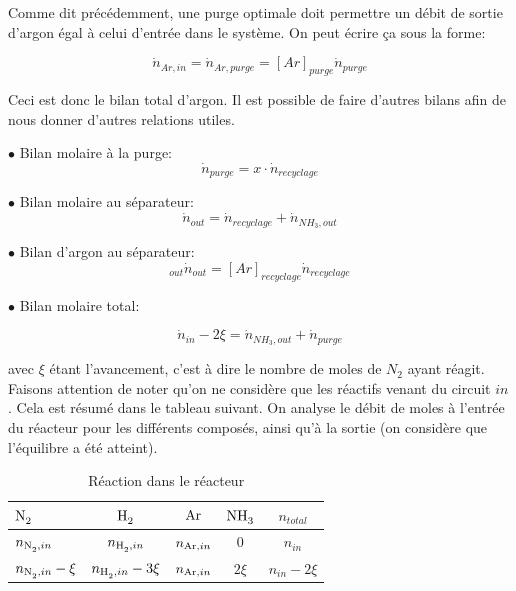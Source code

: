 \documentclass[a4paper, oneside, 12pt]{article}
\begin{document}
Comme dit précédemment, une purge optimale doit permettre un débit 
de sortie d'argon égal à celui d'entrée dans le système. 
On peut écrire ça sous la forme:

\begin{equation}
\dot{n}_{Ar,in}=\dot{n}_{Ar,purge}=[Ar]_{purge} \dot{n}_{purge}
\end{equation}

Ceci est donc le bilan total d'argon. 
Il est possible de faire d'autres bilans afin de nous donner d'autres relations utiles.

$\bullet$ Bilan molaire à la purge:
\begin{equation}
\dot{n}_{purge} = x \cdot \dot{n}_{recyclage}
\label{eq:bilan_mol_purge}
\end{equation}

$\bullet$ Bilan molaire au séparateur:
\begin{equation}
\dot{n}_{out}=\dot{n}_{recyclage}+\dot{n}_{NH_3,out}
\end{equation}

$\bullet$ Bilan d'argon au séparateur:
\begin{equation}
[Ar]_{out} \dot{n}_{out}=[Ar]_{recyclage} \dot{n}_{recyclage}
\end{equation}

$\bullet$ Bilan molaire total:

\begin{equation}
	\dot{n}_{in} - 2\xi=\dot{n}_{NH_3,out} + \dot{n}_{purge}
\end{equation}

avec $\xi$ étant l'avancement, c'est à dire le nombre de moles de $N_2$ ayant réagit. 
Faisons attention de noter qu'on ne considère que les réactifs venant du circuit $in$. 
Cela est résumé dans le tableau suivant. 
On analyse le débit de moles à l'entrée du réacteur pour les différents composés, 
ainsi qu'à la sortie (on considère que l'équilibre a été atteint).

\begin{table}
	\centering
	\begin{tabular}{l|c|c|c|c}
		$\ce{N2}$ & $\ce{H2}$ & $\ce{Ar}$ & $\ce{NH3}$ & $n_{total}$ \\
		\hline
		$n_{\ce{N2},in}$ & $n_{\ce{H2},in}$ & $n_{\ce{Ar},in}$ & $0$  & $n_{in}$\\
		$n_{\ce{N2},in}-\xi$ & $n_{\ce{H2},in}-3\xi$ & $n_{\ce{Ar},in}$ & $2\xi$  & $n_{in}-2\xi$\\
	\end{tabular}
	\caption{Réaction dans le réacteur}
	\label{tab:reaction1_primaire}
\end{table}
\end{document}
